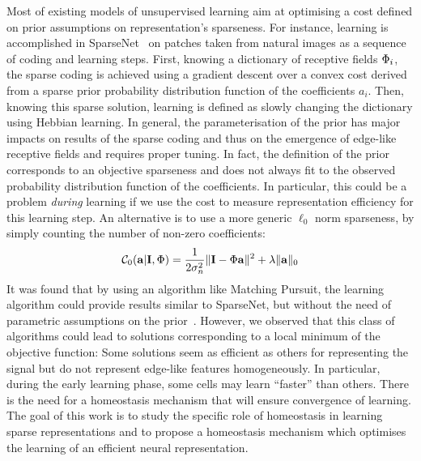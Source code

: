 {Most of existing models of unsupervised learning aim at optimising a cost defined on prior assumptions on representation's sparseness. For instance, learning is accomplished in {\sc SparseNet}~\citep{Olshausen97} on patches taken from natural images as a sequence of coding and learning steps. First, knowing a dictionary of receptive fields $\Phi_i$, the sparse coding is achieved using a gradient descent over a convex cost derived from a sparse prior probability distribution function of the coefficients $a_i$. Then, knowing this sparse solution, learning is defined as slowly changing the dictionary using Hebbian learning. In general, the parameterisation of the prior has major impacts on results of the sparse coding and thus on the emergence of edge-like receptive fields and requires proper tuning. In fact, the definition of the prior corresponds to an objective sparseness and does not always fit to the observed probability distribution function of the coefficients. In particular, this could be a problem \emph{during} learning if we use the cost to measure representation efficiency for this learning step. An alternative is to use a more generic $\ell_0$ norm sparseness, by simply counting the number of non-zero coefficients:
\begin{equation}%
\mathcal{C}_0( \coef | \image , \dico) = \frac{1}{2\sigma_n^2} \| \image - \dico \coef \|^2 + \lambda \| \coef \|_0 \nonumber%
\end{equation}%
It was found that by using an algorithm like Matching Pursuit, the learning algorithm could provide results similar to {\sc SparseNet}, but without the need of parametric assumptions on the prior~\citep{Perrinet10shl}. However, we observed that this class of algorithms could lead to solutions corresponding to a local minimum of the objective function: Some solutions seem as efficient as others for representing the signal but do not represent edge-like features homogeneously. In particular, during the early learning phase, some cells may learn ``faster'' than others. There is the need for a homeostasis mechanism that will ensure convergence of learning. The goal of this work is to study the specific role of homeostasis in learning sparse representations and to propose a homeostasis mechanism which optimises the learning of an efficient neural representation.%

}
